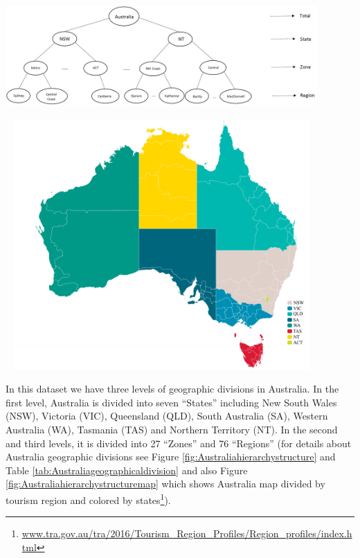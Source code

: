 \documentclass[11pt,a4paper,]{article}
\let\origfigure\figure
\let\endorigfigure\endfigure
\renewenvironment{figure}[1][2] {
    \expandafter\origfigure\expandafter[!htbp]
} {
    \endorigfigure
}
\begin{document}
\begin{figure}

{\centering \includegraphics[width=450px,height=150px]{Paper-Figures/Australian_hierarchy_structure}

}

\caption{Australian geographic hierarchical structure.}\label{fig:Australiahierarchystructure}
\end{figure}

\begin{figure}

{\centering \includegraphics[width=450px,height=360px]{Paper-Figures/ausTurRegions}

}

\caption{Australia tourism region map - colors represent states.}\label{fig:Australiahierarchystructuremap}
\end{figure}

In this dataset we have three levels of geographic divisions in Australia. In the first level, Australia is divided into seven ``States'' including New South Wales (NSW), Victoria (VIC), Queensland (QLD), South Australia (SA), Western Australia (WA), Tasmania (TAS) and Northern Territory (NT). In the second and third levels, it is divided into 27 ``Zones'' and 76 ``Regions'' (for details about Australia geographic divisions see Figure \ref{fig:Australiahierarchystructure} and Table \ref{tab:Australiageographicaldivision} and also Figure \ref{fig:Australiahierarchystructuremap} which shows Australia map divided by tourism region and colored by states\footnote{\url{www.tra.gov.au/tra/2016/Tourism_Region_Profiles/Region_profiles/index.html}}).
\end{document}
